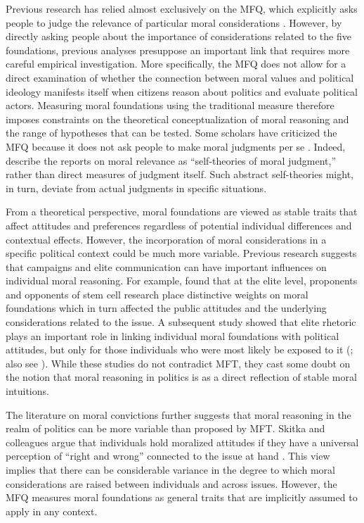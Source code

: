 \documentclass[12pt]{article}
\begin{document}
Previous research has relied almost exclusively on the MFQ, which explicitly asks people to judge the relevance of particular moral considerations \citep[e.g.][]{graham2011mapping}. However, by directly asking people about the importance of considerations related to the five foundations, previous analyses presuppose an important link that requires more careful empirical investigation. More specifically, the MFQ does not allow for a direct examination of whether the connection between moral values and political ideology manifests itself when citizens reason about politics and evaluate political actors. Measuring moral foundations using the traditional measure therefore imposes constraints on the theoretical conceptualization of moral reasoning and the range of hypotheses that can be tested. Some scholars have criticized the MFQ because it does not ask people to make moral judgments per se \citep[e.g.][]{clifford2015moral}. Indeed, \citet[1031]{graham2009liberals} describe the reports on moral relevance as ``self-theories of moral judgment,'' rather than direct measures of judgment itself. Such abstract self-theories might, in turn, deviate from actual judgments in specific situations.

From a theoretical perspective, moral foundations are viewed as stable traits that affect attitudes and preferences regardless of potential individual differences and contextual effects. However, the incorporation of moral considerations in a specific political context could be much more variable. Previous research suggests that campaigns and elite communication can have important influences on individual moral reasoning. For example, \citet{clifford2013words} found that at the elite level, proponents and opponents of stem cell research place distinctive weights on moral foundations which in turn affected the public attitudes and the underlying considerations related to the issue. A subsequent study showed that elite rhetoric plays an important role in linking individual moral foundations with political attitudes, but only for those individuals who were most likely be exposed to it (\citealt{clifford2015concerns}; also see \citealt{day2014shifting}). While these studies do not contradict MFT, they cast some doubt on the notion that moral reasoning in politics is as a direct reflection of stable moral intuitions. 

The literature on moral convictions further suggests that moral reasoning in the realm of politics can be more variable than proposed by MFT. Skitka and colleagues argue that individuals hold moralized attitudes if they have a universal perception of ``right and wrong'' connected to the issue at hand \citep{skitka2005moral,mullen2006exploring,skitka2010psychology,ryan2014reconsidering,ryan2016no}. This view implies that there can be considerable variance in the degree to which moral considerations are raised between individuals and across issues. However, the MFQ measures moral foundations as general traits that are implicitly assumed to apply in any context. 
\end{document}
